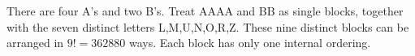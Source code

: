 There are four A's and two B's. Treat AAAA and BB as single blocks, together with the seven distinct letters L,M,U,N,O,R,Z. These nine distinct blocks can be arranged in $\boxed{9!=362880}$ ways. Each block has only one internal ordering.

